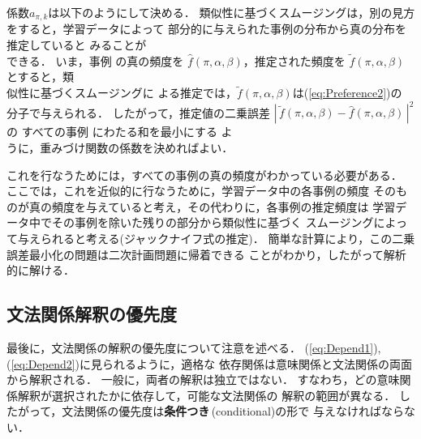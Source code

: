 係数$a_{\pi,k}$は以下のようにして決める．
類似性に基づくスムージングは，別の見方をすると，学\hspace{0.1mm}習データによって
部\hspace{0.1mm}分\hspace{0.1mm}的に与えられた事\hspace{0.1mm}例の分\hspace{0.1mm}布から真の分\hspace{0.1mm}布を推\hspace{0.1mm}定していると
みることが\\できる．
\hspace{-0.3mm}いま，\hspace{-0.3mm}事例 \Formula{$\pi$}{\alpha,\beta} の真の頻度を
$\hat{f}(\pi,\alpha,\beta)$，\hspace{-0.3mm}推定された頻度を
$\tilde{f}(\pi,\alpha,\beta)$とすると，\hspace{-0.3mm}類\\似性に基づくスムージングに
よる推定では，$\tilde{f}(\pi,\alpha,\beta)$は(\ref{eq:Preference2})の
分子で与えられる．
したがって，推定値の二乗誤差
$|\,\tilde{f}(\pi,\alpha,\beta) - \hat{f}(\pi,\alpha,\beta)\,|^2$の
すべての事例 \Formula{$\pi$}{\alpha,\beta} にわたる和を最小にする
よ\\うに，重みづけ関数の係数を決めればよい．

これを行なうためには，すべての事例の真の頻度がわかっている必要がある．
ここでは，これを近似的に行なうために，学習データ中の各事例の頻度
そのものが真の頻度を与えていると考え，その代わりに，各事例の推定頻度は
学習データ中でその事例を除いた残りの部分から類似性に基づく
スムージングによって与えられると考える(ジャックナイフ式の推定)．
簡単な計算により，この二乗誤差最小化の問題は二次計画問題に帰着できる
ことがわかり，したがって解析的に解ける．

\subsection{文法関係解釈の優先度}\label{sec:Corpus-based:Syntactic}

最後に，文法関係の解釈の優先度について注意を述べる．
(\ref{eq:Depend1}), (\ref{eq:Depend2})に見られるように，適格な
依存関係は意味関係と文法関係の両面から解釈される．
一般に，両者の解釈は独立ではない．
すなわち，どの意味関係解釈が選択されたかに依存して，可能な文法関係の
解釈の範囲が異なる．
したがって，文法関係の優先度は{\bf 条件つき}\,(conditional)の形で
与えなければならない．

